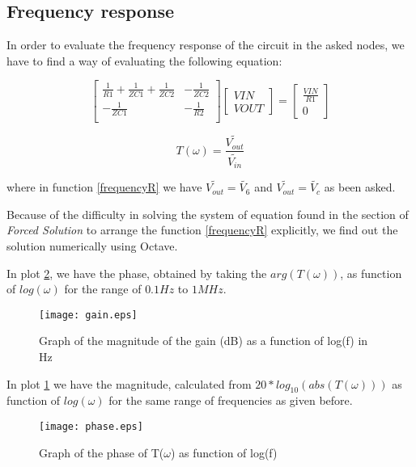 \subsection{Frequency response}

In order to evaluate the frequency response of the circuit in the asked nodes, we have to find a way of evaluating the following equation:


\[
  \begin{bmatrix}
    \frac{1}{R1} + \frac{1}{ZC1} + \frac{1}{ZC2} & -\frac{1}{ZC2} \\
    -\frac{1}{ZC1}                               & -\frac{1}{R2}  \\
  \end{bmatrix}
  \begin{bmatrix}
    VIN \\ VOUT
  \end{bmatrix}
  =
  \begin{bmatrix}
    \frac{VIN}{R1} \\ 0
  \end{bmatrix}
\]

\hfill


\begin{equation}
  T(\omega) = \frac{\widetilde{V_{out}}}{\widetilde{V_{in}}}
  \label{frequencyR}
\end{equation}

where in function \ref{frequencyR} we have $\widetilde{V_{out}} = \tilde{V_6}$ and $\widetilde{V_{out}} = \tilde{V_c}$ as been asked.

Because of the difficulty in solving the system of equation found in the section of \textit{Forced Solution} to arrange the function \ref{frequencyR} explicitly, we find out the solution numerically using Octave.

In plot \ref{fig:argT}, we have the phase, obtained by taking the $arg(T(\omega))$, as function of $log(\omega)$ for the range of $0.1Hz$ to $1MHz$.

\begin{figure}[h] \centering
  \texttt{[image: gain.eps]}
  \caption{Graph of the magnitude of the gain (dB) as a function of log(f) in Hz}
  \label{fig:absT}
\end{figure}

In plot \ref{fig:absT} we have the magnitude, calculated from $20*log_{10}(abs(T(\omega)))$ as function of $log(\omega)$ for the same range of frequencies as given before.

\begin{figure}[h] \centering
  \texttt{[image: phase.eps]}
  \caption{Graph of the phase  of T($\omega$) as function of log(f) }
  \label{fig:argT}
\end{figure}


